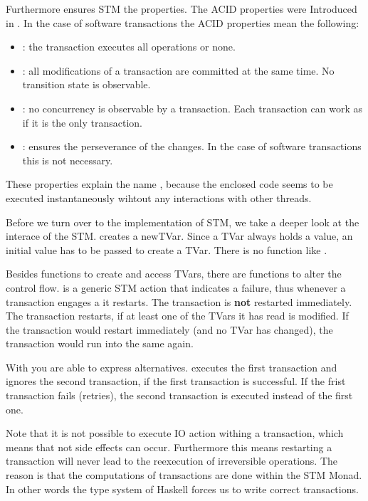 Furthermore ensures STM the  properties. The ACID properties were Introduced in \parencite{DBTrans}.
In the case of software transactions the ACID properties mean the following:
\begin{itemize}
 \item {}: the transaction executes all operations or none.
 \item {}: all modifications of a transaction are committed at the same time. No transition state is observable.
 \item {}: no concurrency is observable by a transaction. Each transaction can work as if it is the only transaction.
 \item {}: ensures the perseverance of the changes. In the case of software transactions this is not necessary.
\end{itemize}
These properties explain the name , because the enclosed code seems to be executed instantaneously wihtout any 
interactions with other threads.

Before we turn over to the implementation of STM, we take a deeper look at the interace of the STM.
 creates a newTVar. Since a TVar always holds a value, an initial value has to be
passed to create a TVar. There is no function like . 

Besides functions to create and access TVars, there are functions to alter the control flow.
 is a generic STM action that indicates a failure, thus whenever a transaction engages a  it restarts. The transaction
is \textbf{not} restarted immediately. The transaction restarts, if at least one of the TVars it has read is modified. If the transaction would
restart immediately (and no TVar has changed), the transaction would run into the same  again. 

With  you are able to express alternatives.  executes the first transaction
and ignores the second transaction, if the first transaction is successful. If the frist transaction fails (retries), the second transaction is 
executed instead of the first one.

Note that it is not possible to execute IO action withing a transaction, which means that not side effects can occur. Furthermore this means
restarting a transaction will never lead to the reexecution of irreversible operations. The reason is that the computations of transactions
are done within the STM Monad. In other words the type system of Haskell forces us to write correct transactions. 

